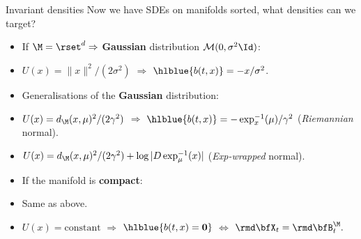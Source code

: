    \begin{frame}{Invariant densities}
   Now we have SDEs on manifolds sorted, what densities can we target?
   
   \begin{itemize}  [triangle]
       \item If $\M = \rset^d \Rightarrow$ \textbf{Gaussian} distribution $\mathcal{M}(0, \sigma^2 \Id)$:
   \end{itemize}
   \vspace{-\topsep}
   \begin{itemize}
       \item $U(x) = \|x \|^2/(2 \sigma^2)$ $\Rightarrow$ $\hlblue{b(t, x)}  = -x / \sigma^2$.
   \end{itemize}
   \pause
   
   \begin{itemize}  [triangle]
       \item Generalisations of the \textbf{Gaussian} distribution:
   \end{itemize}
   \vspace{-\topsep}
   \begin{itemize}
       \item $U(x) = d_\M(x, \mu)^2/(2 \gamma^2)$ $\Rightarrow$ $\hlblue{b(t, x)}  = -\exp^{-1}_x(\mu) / \gamma^2$ (\textit{Riemannian} normal).
       \item $U(x) = d_\M(x, \mu)^2/(2 \gamma^2) + \log |D \exp^{-1}_{\mu}(x)|$ (\textit{Exp-wrapped} normal).
   \end{itemize}
   \pause
   
   \begin{itemize}  [triangle]
       \item If the manifold is \textbf{compact}:
   \end{itemize}
   \vspace{-\topsep}
   \begin{itemize}
       \item Same as above.
       \item $U(x) = \text{constant}$ $\Rightarrow$ $\hlblue{b(t, x) = \mathbf{0}}$ $\Leftrightarrow$ $\rmd \bfX_t = \rmd \bfB_t^\M.$
   \end{itemize}
   \end{frame}
   
